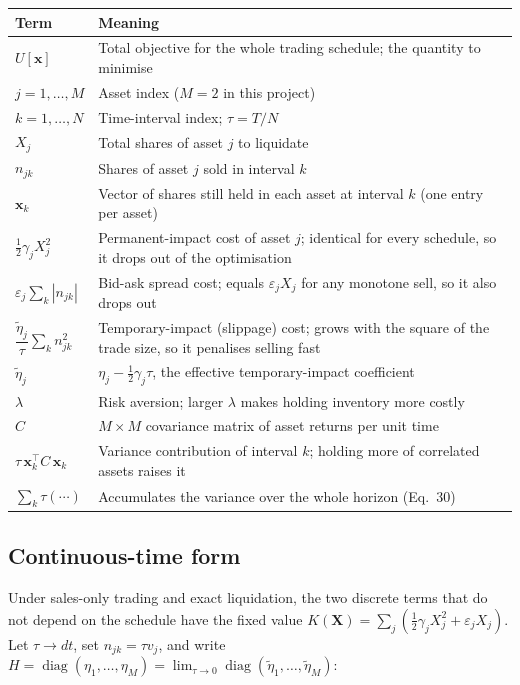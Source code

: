 \documentclass[11pt,a4paper]{article}
\begin{document}
    \begin{center}
    \begin{tabular}{@{}L{3.8cm}L{10cm}@{}}
    \toprule
    \textbf{Term} & \textbf{Meaning} \\
    \midrule
    $U[\mathbf{x}]$ & Total objective for the whole trading schedule; the quantity to minimise \\
    $j = 1,\dots,M$ & Asset index ($M=2$ in this project) \\
    $k = 1,\dots,N$ & Time-interval index; $\tau = T/N$ \\
    $X_j$ & Total shares of asset $j$ to liquidate \\
    $n_{jk}$ & Shares of asset $j$ sold in interval $k$ \\
    $\mathbf{x}_k$ & Vector of shares still held in each asset at interval $k$ (one entry per asset) \\
    $\tfrac{1}{2}\gamma_j X_j^2$ & Permanent-impact cost of asset $j$; identical for every schedule, so it drops out of the optimisation \\
    $\varepsilon_j\sum_k |n_{jk}|$ & Bid-ask spread cost; equals $\varepsilon_j X_j$ for any monotone sell, so it also drops out \\
    $\dfrac{\tilde\eta_j}{\tau}\sum_k n_{jk}^2$ & Temporary-impact (slippage) cost; grows with the square of the trade size, so it penalises selling fast \\
    $\tilde\eta_j$ & $\eta_j - \tfrac12\gamma_j\tau$, the effective temporary-impact coefficient \\
    $\lambda$ & Risk aversion; larger $\lambda$ makes holding inventory more costly \\
    $C$ & $M\times M$ covariance matrix of asset returns per unit time \\
    $\tau\,\mathbf{x}_k^\top C\,\mathbf{x}_k$ & Variance contribution of interval $k$; holding more of correlated assets raises it \\
    $\sum_k \tau(\cdots)$ & Accumulates the variance over the whole horizon (Eq.~30) \\
    \bottomrule
    \end{tabular}
    \end{center}

    \subsection*{Continuous-time form}

    Under sales-only trading and exact liquidation, the two discrete terms that
    do not depend on the schedule have the fixed value
    $K(\mathbf X)=\sum_j(\tfrac12\gamma_jX_j^2+\varepsilon_jX_j)$. Let
    $\tau\to dt$, set $n_{jk}=\tau v_j$, and write
    $H=\operatorname{diag}(\eta_1,\dots,\eta_M)
    =\lim_{\tau\to0}\operatorname{diag}(\tilde\eta_1,\dots,\tilde\eta_M)$:
\end{document}
